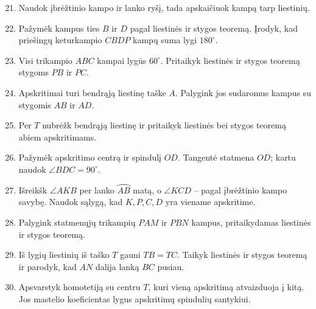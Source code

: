 \documentclass[11pt,a4paper]{scrartcl}
\begin{document}
\begin{enumerate}
    \setcounter{enumi}{20}
    \item Naudok įbrėžtinio kampo ir lanko ryšį, tada apskaičiuok kampą tarp liestinių.
    \item Pažymėk kampus ties $B$ ir $D$ pagal liestinės ir stygos teoremą. Įrodyk, kad priešingų keturkampio $CBDP$ kampų suma lygi $180^\circ$.
    \item Visi trikampio $ABC$ kampai lygūs $60^\circ$. Pritaikyk liestinės ir stygos teoremą stygoms $PB$ ir $PC$.
    \item Apskritimai turi bendrąją liestinę taške $A$. Palygink jos sudaromus kampus su stygomis $AB$ ir $AD$.
    \item Per $T$ nubrėžk bendrąją liestinę ir pritaikyk liestinės bei stygos teoremą abiem apskritimams.
    \item Pažymėk apskritimo centrą ir spindulį $OD$. Tangentė statmena $OD$; kartu naudok $\angle BDC=90^\circ$.
    \item Išreikšk $\angle AKB$ per lanko $\wideparen{AB}$ matą, o $\angle KCD$ – pagal įbrėžtinio kampo savybę. Naudok sąlygą, kad $K,P,C,D$ yra viename apskritime.
    \item Palygink statmenųjų trikampių $PAM$ ir $PBN$ kampus, pritaikydamas liestinės ir stygos teoremą.
    \item Iš lygių liestinių iš taško $T$ gauni $TB=TC$. Taikyk liestinės ir stygos teoremą ir parodyk, kad $AN$ dalija lanką $BC$ pusiau.
    \item Apsvarstyk homotetiją su centru $T$, kuri vieną apskritimą atvaizduoja į kitą. Jos mastelio koeficientas lygus apskritimų spindulių santykiui.
\end{enumerate}
\end{document}
